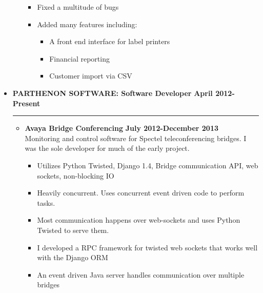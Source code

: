 \documentclass[overlapped]{res}
\begin{document}
\begin{resume}
\begin{itemize}[leftmargin=0in]
\begin{itemize}[leftmargin=0in]
\begin{samepage}
\begin{itemize}
                        \item[\textbullet] Fixed a multitude of bugs
                        \item[\textbullet] Added many features including:
                            \begin{itemize} 
                                \item[\textbullet] A front end interface for label printers 
                                \item[\textbullet] Financial reporting
                                \item[\textbullet] Customer import via CSV 
                            \end{itemize}
                    \end{itemize}
                \end{samepage}
        \end{itemize}
        \vspace{0.125in}
    \item[] 
        \textbf{PARTHENON SOFTWARE: Software Developer} \hfill \textbf{April 2012-Present} \\[-0.1in] \rule{\textwidth}{0.5pt}
        \begin{itemize}[leftmargin=0in]
            \item[] 
                \begin{samepage}
                    \textbf{Avaya Bridge Conferencing} \hfill \textbf{July 2012-December 2013} \\
                    Monitoring and control software for Spectel teleconferencing bridges. I was the sole developer for much of the early project.
                    \begin{itemize}
                        \item[\textbullet] Utilizes Python Twisted, Django 1.4, Bridge communication API, web sockets, non-blocking IO
                        \item[\textbullet] Heavily concurrent. Uses concurrent event driven code to perform tasks.
                        \item[\textbullet] Most communication happens over web-sockets and uses Python Twisted to serve them.
                        \item[\textbullet] I developed a RPC framework for twisted web sockets that works well with the Django ORM
                        \item[\textbullet] An event driven Java server handles communication over multiple bridges

\end{itemize}
\end{samepage}
\end{itemize}
\end{itemize}
\end{resume}
\end{document}
